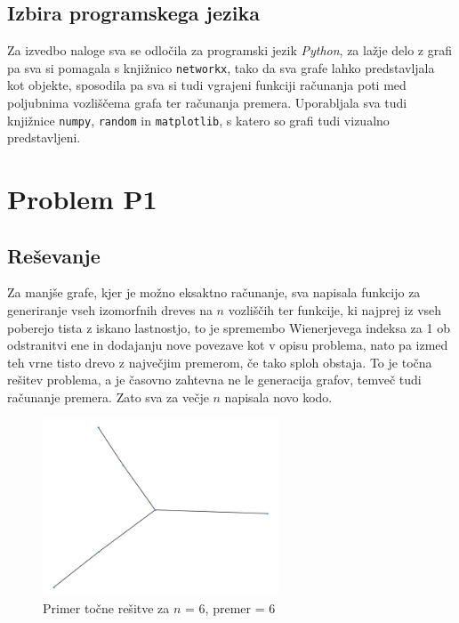 \documentclass[a4paper, 12 pt]{article}
\begin{document}
\subsection{Izbira programskega jezika}

Za izvedbo naloge sva se odločila za programski jezik \textit{Python}, za lažje delo z grafi pa sva si pomagala s knjižnico \texttt{networkx}, tako da sva grafe lahko predstavljala kot objekte, sposodila pa sva si tudi vgrajeni funkciji računanja poti med poljubnima vozliščema grafa ter računanja premera. Uporabljala sva tudi knjižnice \texttt{numpy}, \texttt{random} in \texttt{matplotlib}, s katero so grafi tudi vizualno predstavljeni.



\pagebreak

\section{Problem P1}

\subsection{Reševanje}

Za manjše grafe, kjer je možno eksaktno računanje, sva napisala funkcijo za generiranje vseh izomorfnih dreves na $n$ vozliščih ter funkcije, ki najprej iz vseh poberejo tista z iskano lastnostjo, to je spremembo Wienerjevega indeksa za 1 ob odstranitvi ene in dodajanju nove povezave kot v opisu problema, nato pa izmed teh vrne tisto drevo z največjim premerom, če tako sploh obstaja. To je točna rešitev problema, a je časovno zahtevna ne le generacija grafov, temveč tudi računanje premera. Zato sva za večje $n$ napisala novo kodo.


\begin{figure}[H]
\centering
  \includegraphics[width=7cm]{drevo6diam4.png}
  \caption{Primer točne rešitve za $n$ = 6, premer = 6}
  \label{fig:graf1} 
\end{figure}
\end{document}

